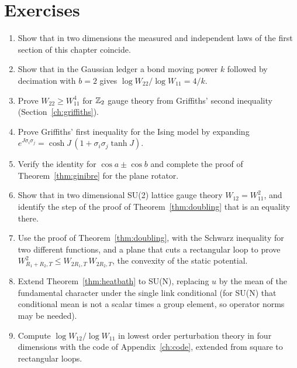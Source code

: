 \section*{Exercises}
\begin{enumerate}
\item Show that in two dimensions the measured and independent laws of the first section of this chapter coincide.
\item Show that in the Gaussian ledger a bond moving power $k$ followed by decimation with $b=2$ gives $\log W_{22}/\log W_{11}=4/k$.
\item Prove $W_{22}\ge W_{11}^4$ for $\mathbb{Z}_2$ gauge theory from Griffiths' second inequality (Section~\ref{ch:griffiths}).
\item Prove Griffiths' first inequality for the Ising model by expanding $e^{J\sigma_i\sigma_j}=\cosh J\,(1+\sigma_i\sigma_j\tanh J)$.
\item Verify the identity for $\cos a\pm\cos b$ and complete the proof of Theorem~\ref{thm:ginibre} for the plane rotator.
\item Show that in two dimensional SU(2) lattice gauge theory $W_{12}=W_{11}^2$, and identify the step of the proof of Theorem~\ref{thm:doubling} that is an equality there.
\item Use the proof of Theorem~\ref{thm:doubling}, with the Schwarz inequality for two different functions, and a plane that cuts a rectangular loop to prove $W_{R_1+R_2,T}^2\le W_{2R_1,T}\,W_{2R_2,T}$, the convexity of the static potential.
\item Extend Theorem~\ref{thm:heatbath} to SU(N), replacing $u$ by the mean of the fundamental character under the single link conditional (for SU(N) that conditional mean is not a scalar times a group element, so operator norms may be needed).
\item Compute $\log W_{12}/\log W_{11}$ in lowest order perturbation theory in four dimensions with the code of Appendix~\ref{ch:code}, extended from square to rectangular loops.
\end{enumerate}
